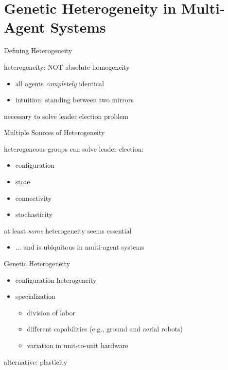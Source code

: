 \section{Genetic Heterogeneity in Multi-Agent Systems}

\begin{frame}{Defining Heterogeneity}

heterogeneity: NOT absolute homogeneity
\begin{itemize}
\item all agents \textit{completely} identical
\item intuition: standing between two mirrors
\end{itemize}

\vspace{2ex}

necessary to solve leader election problem \cite{angluin1980local,banda2015configuration}

\end{frame}

\begin{frame}{Multiple Sources of Heterogeneity}

heterogeneous groups can solve leader election:
\begin{itemize}
\item configuration \cite{frederickson1987electing}
\item state \cite{banda2015configuration}
\item connectivity \cite{antonoiu1996self}
\item stochasticity \cite{itai1981symmetry}
\end{itemize}

\vspace{2ex}

at least \textit{some} heterogeneity seems essential
\begin{itemize}
\item ... and is ubiquitous in multi-agent systems \cite{atodd2015quantitative, perna2012individual, fayeez2017h}
\end{itemize}


\end{frame}

\begin{frame}{Genetic Heterogeneity}

\begin{itemize}
\item configuration heterogeneity
\item specialization
\begin{itemize}
\item division of labor \cite{potter2001heterogeneity}
\item different capabilities (e.g., ground and aerial robots) \cite{gomes2015cooperative, mathews2012supervised}
\item variation in unit-to-unit hardware \cite{pugh2007parallel, duarte2016evolution}
\end{itemize}
\end{itemize}

alternative: plasticity \cite{tuci2008evolving}

\end{frame}


